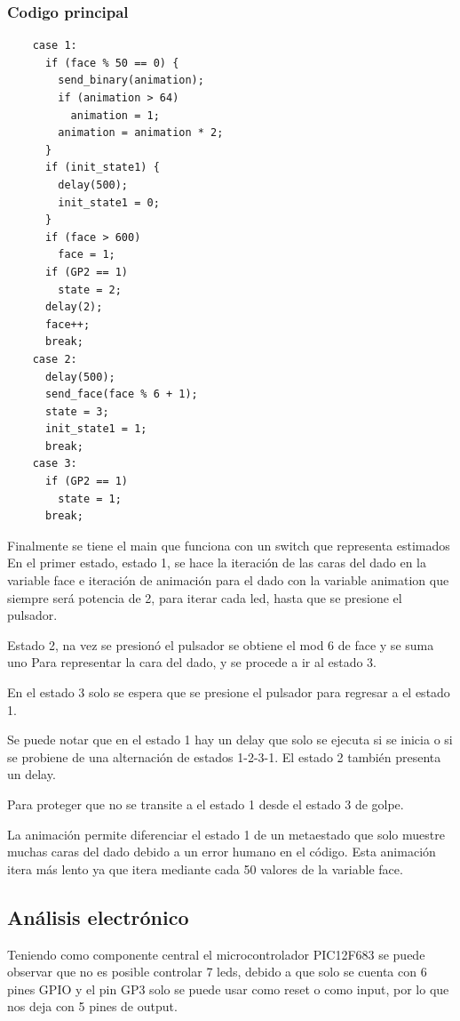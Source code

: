 \documentclass[12pt,a4paper]{article}
\begin{document}
\subsubsection{Codigo principal}

\begin{verbatim}
    case 1:
      if (face % 50 == 0) {
        send_binary(animation);
        if (animation > 64)
          animation = 1;
        animation = animation * 2;
      }
      if (init_state1) {
        delay(500);
        init_state1 = 0;
      }
      if (face > 600)
        face = 1;
      if (GP2 == 1)
        state = 2;
      delay(2);
      face++;
      break;
    case 2:
      delay(500);
      send_face(face % 6 + 1);
      state = 3;
      init_state1 = 1;
      break;
    case 3:
      if (GP2 == 1)
        state = 1;
      break;
\end{verbatim}

Finalmente se tiene el main que funciona con un switch que representa estimados
En el primer estado, estado 1, se hace la iteración de las caras del dado en la variable face
e iteración de animación para el dado con la variable animation que siempre será 
potencia de 2, para iterar cada led, hasta que se presione el pulsador.

Estado 2, na vez se presionó el pulsador se obtiene el mod 6 de face y se suma uno
Para representar la cara del dado, y se procede a ir al estado 3.

En el estado 3 solo se espera que se presione el pulsador para regresar a el estado 1.


Se puede notar que en el estado 1 hay un delay que solo se ejecuta si se inicia o si se
probiene de una alternación de estados 1-2-3-1. El estado 2 también presenta un delay.

Para proteger que no se transite a el estado 1 desde el estado 3 de golpe.


La animación permite diferenciar el estado 1 de un metaestado que solo muestre muchas 
caras del dado debido a un error humano en el código. Esta animación itera más lento
ya que itera mediante cada 50 valores de la variable face.

\subsection{Análisis electrónico}

  Teniendo como componente central el microcontrolador PIC12F683 se puede observar que no
  es posible controlar 7 leds, debido a que solo se cuenta con 6 pines GPIO y el pin GP3
  solo se puede usar como reset o como input, por lo que nos deja con 5 pines de output.
  
\end{document}
